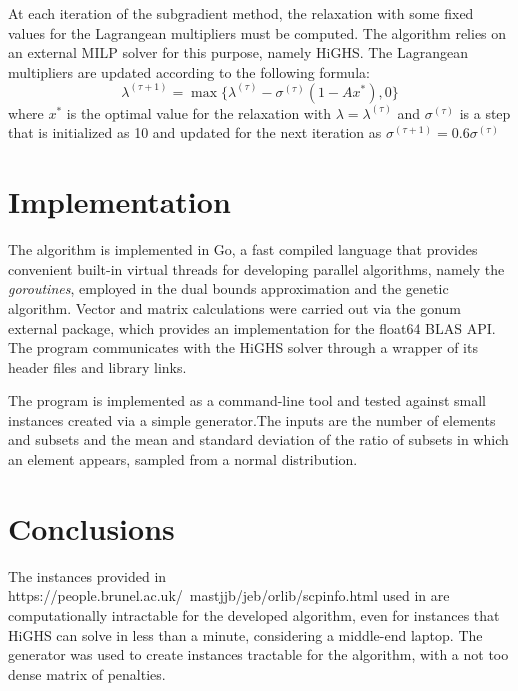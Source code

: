 \documentclass[a4paper]{article}
\begin{document}
At each iteration of the subgradient method, the relaxation with some fixed values for the Lagrangean multipliers must be computed. The algorithm relies on an external MILP solver for this purpose, namely HiGHS.
The Lagrangean multipliers are updated according to the following formula:
$$
\lambda^{(\tau+1)}=\max\{\lambda^{(\tau)} - \sigma^{(\tau)}(1 - Ax^*), 0\}
$$
where $x^*$ is the optimal value for the relaxation with $\lambda=\lambda^{(\tau)}$ and $\sigma^{(\tau)}$ is a step that is initialized as 10 and updated for the next iteration as $\sigma^{(\tau+1)}=0.6\sigma^{(\tau)}$

\section{Implementation}

The algorithm is implemented in Go, a fast compiled language that provides convenient built-in virtual threads for developing parallel algorithms, namely the \textit{goroutines}, employed in the dual bounds approximation and the genetic algorithm.
Vector and matrix calculations were carried out via the gonum external package, which provides an implementation for the float64 BLAS API.
The program communicates with the HiGHS solver through a wrapper of its header files and library links.

The program is implemented as a command-line tool and tested against small instances created via a simple generator.The inputs are the number of elements and subsets and the mean and standard deviation of the ratio of subsets in which an element appears, sampled from a normal distribution.

\section{Conclusions}

The instances provided in https://people.brunel.ac.uk/~mastjjb/jeb/orlib/scpinfo.html used in \cite{CARRABS2024106620} are computationally intractable for the developed algorithm, even for instances that HiGHS can solve in less than a minute, considering a middle-end laptop. The generator was used to create instances tractable for the algorithm, with a not too dense matrix of penalties. 

\printbibliography
\end{document}
